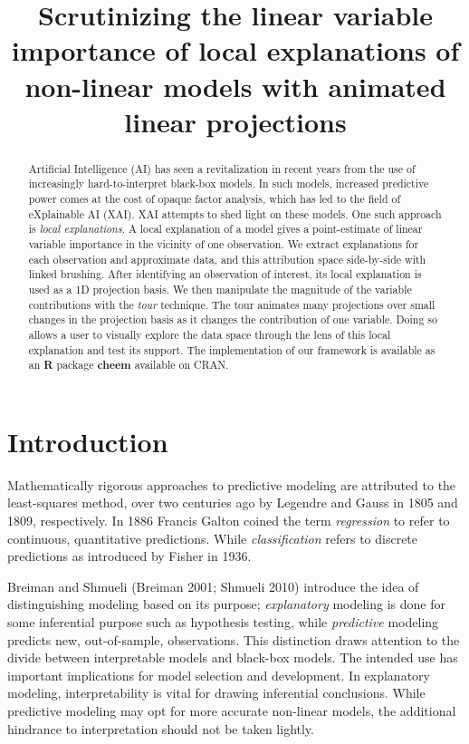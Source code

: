\documentclass[
  article]{article}
\title{Scrutinizing the linear variable importance of local explanations of non-linear models with animated linear projections}
\author{}
\date{\vspace{-2.5em}}
\begin{document}
\maketitle
\begin{abstract}
Artificial Intelligence (AI) has seen a revitalization in recent years from the use of increasingly hard-to-interpret black-box models. In such models, increased predictive power comes at the cost of opaque factor analysis, which has led to the field of eXplainable AI (XAI). XAI attempts to shed light on these models. One such approach is \emph{local explanations}. A local explanation of a model gives a point-estimate of linear variable importance in the vicinity of one observation. We extract explanations for each observation and approximate data, and this attribution space side-by-side with linked brushing. After identifying an observation of interest, its local explanation is used as a 1D projection basis. We then manipulate the magnitude of the variable contributions with the \emph{tour} technique. The tour animates many projections over small changes in the projection basis as it changes the contribution of one variable. Doing so allows a user to visually explore the data space through the lens of this local explanation and test its support. The implementation of our framework is available as an \textbf{R} package \textbf{cheem} available on CRAN.
\end{abstract}

\hypertarget{sec:intro}{%
\section{Introduction}\label{sec:intro}}

Mathematically rigorous approaches to predictive modeling are attributed to the least-squares method, over two centuries ago by Legendre and Gauss in 1805 and 1809, respectively. In 1886 Francis Galton coined the term \emph{regression} to refer to continuous, quantitative predictions. While \emph{classification} refers to discrete predictions as introduced by Fisher in 1936.

Breiman and Shmueli (Breiman 2001; Shmueli 2010) introduce the idea of distinguishing modeling based on its purpose; \emph{explanatory} modeling is done for some inferential purpose such as hypothesis testing, while \emph{predictive} modeling predicts new, out-of-sample, observations. This distinction draws attention to the divide between interpretable models and black-box models. The intended use has important implications for model selection and development. In explanatory modeling, interpretability is vital for drawing inferential conclusions. While predictive modeling may opt for more accurate non-linear models, the additional hindrance to interpretation should not be taken lightly.
\end{document}
